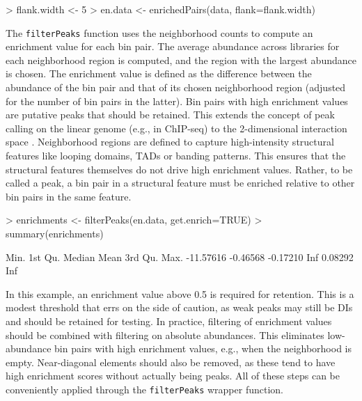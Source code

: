 \documentclass[12pt]{report}
\renewenvironment{Schunk}{\vspace{0pt}}{\vspace{0pt}}
\newcommand{\code}[1]{{\small\texttt{#1}}}
\begin{document}
\begin{Schunk}
\begin{Sinput}
> flank.width <- 5
> en.data <- enrichedPairs(data, flank=flank.width)
\end{Sinput}
\end{Schunk}

The \code{filterPeaks} function uses the neighborhood counts to compute an enrichment value for each bin pair.
The average abundance across libraries for each neighborhood region is computed, and the region with the largest abundance is chosen.
The enrichment value is defined as the difference between the abundance of the bin pair and that of its chosen neighborhood region (adjusted for the number of bin pairs in the latter).
Bin pairs with high enrichment values are putative peaks that should be retained.
This extends the concept of peak calling on the linear genome (e.g., in ChIP-seq) to the 2-dimensional interaction space \citep{rao2014kilobase}.
Neighborhood regions are defined to capture high-intensity structural features like looping domains, TADs or banding patterns.
This ensures that the structural features themselves do not drive high enrichment values.
Rather, to be called a peak, a bin pair in a structural feature must be enriched relative to other bin pairs in the same feature.

\begin{Schunk}
\begin{Sinput}
> enrichments <- filterPeaks(en.data, get.enrich=TRUE)
> summary(enrichments)   
\end{Sinput}
\begin{Soutput}
     Min.   1st Qu.    Median      Mean   3rd Qu.      Max. 
-11.57616  -0.46568  -0.17210       Inf   0.08292       Inf 
\end{Soutput}
\end{Schunk}

In this example, an enrichment value above 0.5 is required for retention.
This is a modest threshold that errs on the side of caution, as weak peaks may still be DIs and should be retained for testing.
In practice, filtering of enrichment values should be combined with filtering on absolute abundances.
This eliminates low-abundance bin pairs with high enrichment values, e.g., when the neighborhood is empty.
Near-diagonal elements should also be removed, as these tend to have high enrichment scores without actually being peaks.
All of these steps can be conveniently applied through the \code{filterPeaks} wrapper function.
\end{document}
